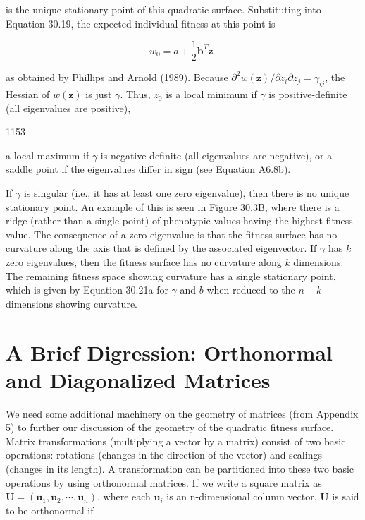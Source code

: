 \documentclass{article}
\begin{document}
is the unique stationary point of this quadratic surface. Substituting into Equation 30.19, the expected individual fitness at this point is

\begin{equation}
w_{0}=a+\frac{1}{2}\mathbf{b}^{T}\mathbf{z}_{0}
\tag{30.21b}
\label{eq:30_21b}
\end{equation}

as obtained by Phillips and Arnold (1989). Because  $ \partial^2 w(\mathbf{z}) / \partial z_i \partial z_j = \gamma_{ij} $, the Hessian of  $ w(\mathbf{z}) $ is just  $ \gamma $. Thus,  $ z_0 $ is a local minimum if  $ \gamma $ is positive-definite (all eigenvalues are positive),

1153

a local maximum if  $ \gamma $ is negative-definite (all eigenvalues are negative), or a saddle point if the eigenvalues differ in sign (see Equation A6.8b).

If  $ \gamma $ is singular (i.e., it has at least one zero eigenvalue), then there is no unique stationary point. An example of this is seen in Figure 30.3B, where there is a ridge (rather than a single point) of phenotypic values having the highest fitness value. The consequence of a zero eigenvalue is that the fitness surface has no curvature along the axis that is defined by the associated eigenvector. If  $ \gamma $ has  $ k $ zero eigenvalues, then the fitness surface has no curvature along  $ k $ dimensions. The remaining fitness space showing curvature has a single stationary point, which is given by Equation 30.21a for  $ \gamma $ and  $ b $ when reduced to the  $ n - k $ dimensions showing curvature.

\section{A Brief Digression: Orthonormal and Diagonalized Matrices}
We need some additional machinery on the geometry of matrices (from Appendix 5) to further our discussion of the geometry of the quadratic fitness surface. Matrix transformations (multiplying a vector by a matrix) consist of two basic operations: rotations (changes in the direction of the vector) and scalings (changes in its length). A transformation can be partitioned into these two basic operations by using orthonormal matrices. If we write a square matrix as  $ \mathbf{U} = (\mathbf{u}_1, \mathbf{u}_2, \cdots, \mathbf{u}_n) $, where each  $ \mathbf{u}_i $ is an n-dimensional column vector,  $ \mathbf{U} $ is said to be orthonormal if
\end{document}

